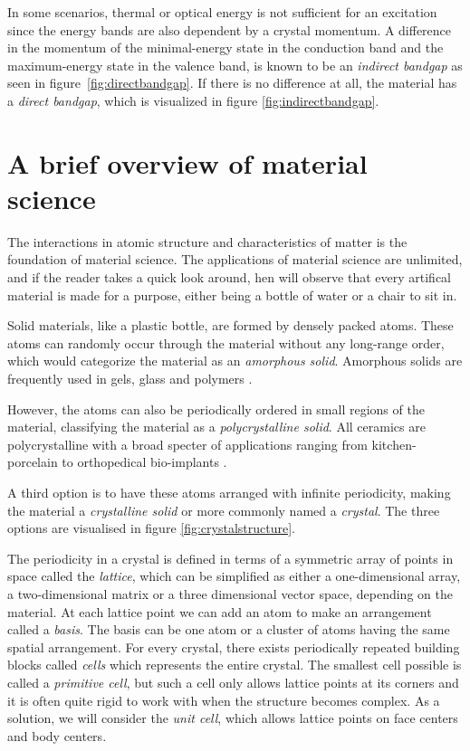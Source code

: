 In some scenarios, thermal or optical energy is not sufficient for an excitation since the energy bands are also dependent by a crystal momentum. A difference in the momentum of the minimal-energy state in the conduction band and the maximum-energy state in the valence band, is known to be an \textit{indirect bandgap} as seen in figure \ref{fig:directbandgap}. If there is no difference at all, the material has a \textit{direct bandgap}, which is visualized in figure \ref{fig:indirectbandgap}.


\section{A brief overview of material science}

The interactions in atomic structure and characteristics of matter is the foundation of material science. The applications of material science are unlimited, and if the reader takes a quick look around, hen will observe that every artifical material is made for a purpose, either being a bottle of water or a chair to sit in.

Solid materials, like a plastic bottle, are formed by densely packed atoms. These atoms can randomly occur through the material without any long-range order, which would categorize the material as an \textit{amorphous solid}. Amorphous solids are frequently used in gels, glass and polymers \cite{BenStreetman2015}.

However, the atoms can also be periodically ordered in small regions of the material, classifying the material as a \textit{polycrystalline solid}. All ceramics are polycrystalline with a broad specter of applications ranging from kitchen-porcelain to orthopedical bio-implants \cite{Renganathan2018}.

A third option is to have these atoms arranged with infinite periodicity, making the material a \textit{crystalline solid} or more commonly named a \textit{crystal}. The three options are visualised in figure \ref{fig:crystalstructure}.

The periodicity in a crystal is defined in terms of a symmetric array of points in space called the \textit{lattice}, which can be simplified as either a one-dimensional array, a two-dimensional matrix or a three dimensional vector space, depending on the material. At each lattice point we can add an atom to make an arrangement called a \textit{basis}. The basis can be one atom or a cluster of atoms having the same spatial arrangement. For every crystal, there exists periodically repeated building blocks called \textit{cells} which represents the entire crystal. The smallest cell possible is called a \textit{primitive cell}, but such a cell only allows lattice points at its corners and it is often quite rigid to work with when the structure becomes complex. As a solution, we will consider the \textit{unit cell}, which allows lattice points on face centers and body centers.

